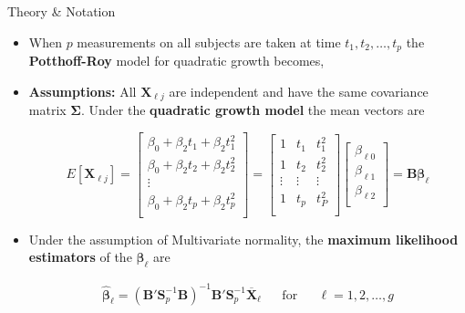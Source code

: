 \documentclass[8pt]{beamer}
\begin{document}
\begin{frame}{Theory \& Notation} %
    \begin{itemize}
        \item When $p$ measurements on all subjects are taken at time $t_{1},t_{2},\hdots,t_{p}$ the \textbf{Potthoff-Roy} model for quadratic growth becomes, 
        \item \textbf{Assumptions:} All $\mathbf{X}_{\ell j}$ are independent and have the same covariance matrix $\mathbf{\Sigma}$. Under the \textbf{quadratic growth model} the mean vectors are
        
        \begin{displaymath}
        E[\mathbf{X}_{\ell j}] 
            =
            \begin{bmatrix}
                    \beta_{0} + \beta_{2}t_{1} + \beta_{2}t_{1}^{2} \\
                    \beta_{0} + \beta_{2}t_{2} + \beta_{2}t_{2}^{2} \\
                    \vdots \\
                    \beta_{0} + \beta_{2}t_{p} + \beta_{2}t_{p}^{2} \\
            \end{bmatrix}
            =
            \begin{bmatrix}
                1 & t_{1} & t_{1}^{2} \\
                1 & t_{2} & t_{2}^{2} \\
                \vdots & \vdots & \vdots \\
                1 & t_{p} & t_{P}^{2} \\
            \end{bmatrix}
            \begin{bmatrix}
                    \beta_{\ell 0}\\
                    \beta_{\ell 1} \\
                    \beta_{\ell 2} \\
            \end{bmatrix}
            =\mathbf{B\mathbf{\beta}_{\ell}}
        \end{displaymath}
        
        
        \item Under the assumption of Multivariate normality, the \textbf{maximum likelihood estimators} of the $\mathbf{\beta}_{\ell}$ are 
        
        \begin{align}
            \mathbf{\hat{\beta}}_{\ell} = (\mathbf{B}'\mathbf{S}^{-1}_{p}\mathbf{B})^{-1}\mathbf{B}'\mathbf{S}^{-1}_{p}\mathbf{\overline{X}}_{\ell} && \text{for} && \ell = 1,2,\hdots,g
        \end{align}
        
    \end{itemize}
\end{frame}
\end{document}
